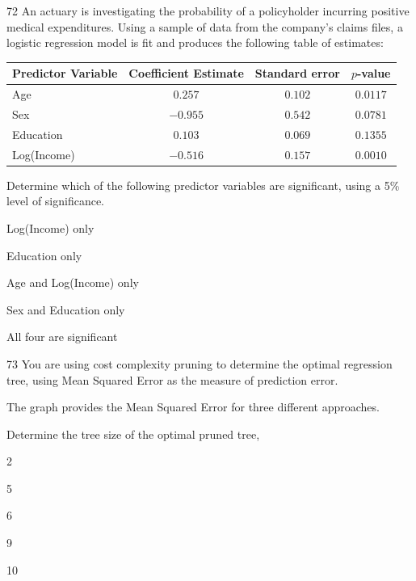 \begin{question}{72}
An actuary is investigating the probability of a policyholder incurring positive medical expenditures. Using a sample of data from the company's claims files, a logistic regression model is fit and produces the following table of estimates:
\begin{center}
\begin{tabular}{|l|c|c|c|}
\hline
Predictor Variable & Coefficient Estimate & Standard error & $p$-value \\ \hline
Age & $0.257$ & $0.102$ & $0.0117$ \\ \hline
Sex & $-0.955$ & $0.542$ & $0.0781$ \\ \hline
Education & $0.103$ & $0.069$ & $0.1355$ \\ \hline
Log(Income) & $-0.516$ & $0.157$ & $0.0010$ \\ \hline
\end{tabular}
\end{center}

Determine which of the following predictor variables are significant, using a 5\% level of significance.

\begin{choices}
\item Log(Income) only
\item Education only
\item Age and Log(Income) only
\item Sex and Education only
\item All four are significant
\end{choices}
\end{question}

\begin{question}{73}
You are using cost complexity pruning to determine the optimal regression tree, using Mean Squared Error as the measure of prediction error.

The graph provides the Mean Squared Error for three different approaches.


Determine the tree size of the optimal pruned tree,

\begin{choices}
\item 2
\item 5
\item 6
\item 9
\item 10
\end{choices}
\end{question}

